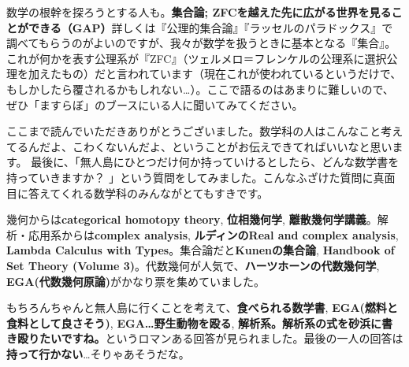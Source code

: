数学の根幹を探ろうとする人も。\textbf{集合論; ZFCを越えた先に広がる世界を見ることができる（GAP）}詳しくは『公理的集合論』『ラッセルのパラドックス』で調べてもらうのがよいのですが、我々が数学を扱うときに基本となる『集合』。これが何かを表す公理系が『ZFC』（ツェルメロ＝フレンケルの公理系に選択公理を加えたもの）だと言われています（現在これが使われているというだけで、もしかしたら覆されるかもしれない…）。ここで語るのはあまりに難しいので、ぜひ「ますらぼ」のブースにいる人に聞いてみてください。

ここまで読んでいただきありがとうございました。数学科の人はこんなこと考えてるんだよ、こわくないんだよ、ということがお伝えできてればいいなと思います。
最後に、「無人島にひとつだけ何か持っていけるとしたら、どんな数学書を持っていきますか？ 」という質問をしてみました。こんなふざけた質問に真面目に答えてくれる数学科のみんながとてもすきです。

幾何からは\textbf{categorical homotopy theory}, \textbf{位相幾何学}, \textbf{離散幾何学講義}。解析・応用系からは\textbf{complex analysis}, \textbf{ルディンのReal and complex analysis}, \textbf{Lambda Calculus with Types}。集合論だと\textbf{Kunenの集合論}, \textbf{Handbook of Set Theory (Volume 3)}。代数幾何が人気で、\textbf{ハーツホーンの代数幾何学}, \textbf{EGA(代数幾何原論)}がかなり票を集めていました。

もちろんちゃんと無人島に行くことを考えて、\textbf{食べられる数学書}, \textbf{EGA(燃料と食料として良さそう)}, \textbf{EGA…野生動物を殴る}, \textbf{解析系。解析系の式を砂浜に書き殴りたいですね。}というロマンある回答が見られました。最後の一人の回答は\textbf{持って行かない}…そりゃあそうだな。